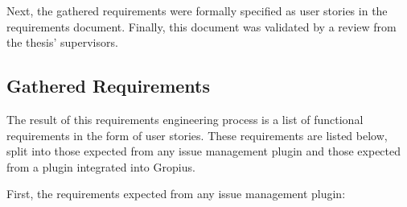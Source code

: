 Next, the gathered requirements were formally specified as user stories in the requirements document.
Finally, this document was validated by a review from the thesis' supervisors.


\subsection*{Gathered Requirements}
The result of this requirements engineering process is a list of functional requirements in the form of user stories.
These requirements are listed below, split into those expected from any issue management plugin and those expected from a plugin integrated into Gropius.


First, the requirements expected from any issue management plugin:
